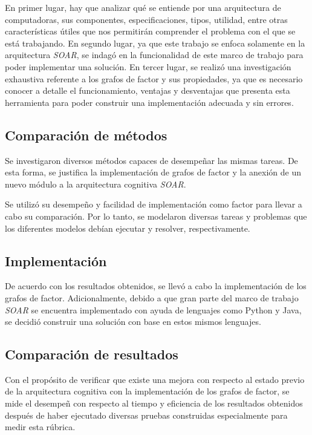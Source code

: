  En primer lugar, hay que analizar qu\'{e} se entiende por una arquitectura de computadoras, sus componentes, especificaciones, tipos, utilidad, entre otras caracter\'{i}sticas \'{u}tiles que nos permitir\'{a}n comprender el problema con el que se est\'{a} trabajando. En segundo lugar, ya que este trabajo se enfoca solamente en la arquitectura \emph{SOAR}, se indag\'{o} en la funcionalidad de este marco de trabajo para poder implementar una soluci\'{o}n. En tercer lugar, se realiz\'{o} una investigaci\'{o}n exhaustiva referente a los grafos de factor y sus propiedades, ya que es necesario conocer a detalle el funcionamiento, ventajas y desventajas que presenta esta herramienta para poder construir una implementaci\'{o}n adecuada y sin errores.
 
 \subsection{Comparaci\'{o}n de m\'{e}todos}
 
 Se investigaron diversos m\'{e}todos capaces de desempe\~nar las mismas tareas. De esta forma, se justifica la implementaci\'{o}n de grafos de factor y la anexi\'{o}n de un nuevo m\'{o}dulo a la arquitectura cognitiva \emph{SOAR}.
 
 Se utiliz\'{o} su desempe\~no y facilidad de implementaci\'{o}n como factor para llevar a cabo su comparaci\'{o}n. Por lo tanto, se modelaron diversas tareas y problemas que los diferentes modelos deb\'{i}an ejecutar y resolver, respectivamente.
 
 \subsection{Implementaci\'{o}n}
 
 De acuerdo con los resultados obtenidos, se llev\'{o} a cabo la implementaci\'{o}n de los grafos de factor. Adicionalmente, debido a que gran parte del marco de trabajo \emph{SOAR} se encuentra implementado con ayuda de lenguajes como Python y Java, se decidi\'{o} construir una soluci\'{o}n con base en estos mismos lenguajes. 
 
 \subsection{Comparaci\'{o}n de resultados}
 
 Con el prop\'{o}sito de verificar que existe una mejora con respecto al estado previo de la arquitectura cognitiva con la implementaci\'{o}n de los grafos de factor, se mide el desempe\~n con respecto al tiempo y eficiencia de los resultados obtenidos despu\'{e}s de haber ejecutado diversas pruebas construidas especialmente para medir esta r\'{u}brica.
 
  